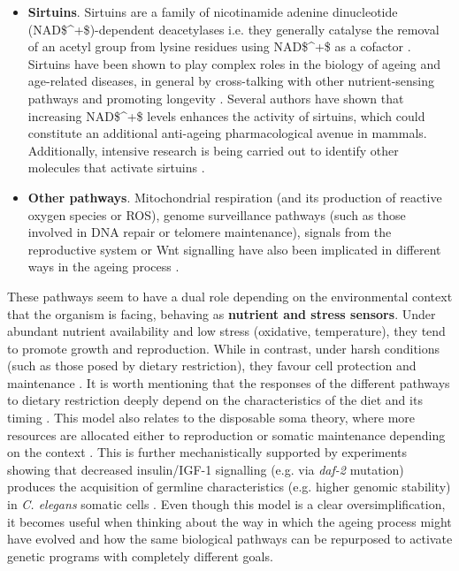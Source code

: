 \begin{itemize}
	\item \textbf{Sirtuins}. Sirtuins are a family of nicotinamide adenine dinucleotide (\acrshort{NAD$^+$})-dependent deacetylases i.e. they generally catalyse the removal of an acetyl group from lysine residues using \acrshort{NAD$^+$} as a cofactor \citep{Bonkowski2016}. Sirtuins have been shown to play complex roles in the biology of ageing and age-related diseases, in general by cross-talking with other nutrient-sensing pathways and promoting longevity \citep{Kenyon2010,Bonkowski2016}. Several authors have shown that increasing \acrshort{NAD$^+$} levels enhances the activity of sirtuins, which could constitute an additional anti-ageing pharmacological avenue in mammals. Additionally, intensive research is being carried out to identify other molecules that activate sirtuins \citep{Bonkowski2016}.
	
	\item \textbf{Other pathways}. Mitochondrial respiration (and its production of reactive oxygen species or \acrshort{ROS}), genome surveillance pathways (such as those involved in DNA repair or telomere maintenance), signals from the reproductive system or Wnt signalling have also been implicated in different ways in the ageing process \citep{Kenyon2010,Greer2008, Lezzerini2014}.
	
\end{itemize}


These pathways seem to have a dual role depending on the environmental context that the organism is facing, behaving as \textbf{nutrient and stress sensors}. Under abundant nutrient availability and low stress (oxidative, temperature), they tend to promote growth and reproduction. While in contrast, under harsh conditions (such as those posed by dietary restriction), they favour cell protection and maintenance \citep{Kenyon2005,Kenyon2010}. It is worth mentioning that the responses of the different pathways to dietary restriction deeply depend on the characteristics of the diet and its timing \citep{Kenyon2010}. This model also relates to the disposable soma theory, where more resources are allocated either to reproduction or somatic maintenance depending on the context \citep{Kirkwood1977,Kirkwood1991}. This is further mechanistically supported by experiments showing that decreased insulin/IGF-1 signalling (e.g. via \textit{daf-2} mutation) produces the acquisition of germline characteristics (e.g. higher genomic stability) in \textit{C. elegans} somatic cells \citep{Curran2009}. Even though this model is a clear oversimplification, it becomes useful when thinking about the way in which the ageing process might have evolved and how the same biological pathways can be repurposed to activate genetic programs with completely different goals.

